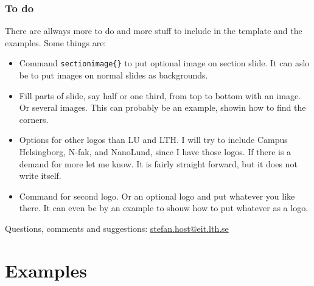 \documentclass[aspectratio=1610]{beamer}
\def\txtbs{\symbol{92}}
\begin{document}
\begin{frame}%
  \frametitle{To do}
  There are allways more to do and more stuff to include in the template and the examples. Some things are: 
  \begin{itemize}
  \item Command \texttt{\txtbs sectionimage\{\}} to put optional image on section slide. It can aslo be to put images on normal slides as backgrounds. 
  \item Fill parts of slide, say half or one third, from top to bottom with an image. Or several images. This can probably be an example, showin how to find the corners. 
  \item Options for other logos than LU and LTH. I will try to include Campus Helsingborg, N-fak, and NanoLund, since I have those logos. If there is a demand for more let me know. It is fairly straight forward, but it does not write itself.
  \item Command for second logo. Or an optional logo and put whatever you like there. It can even be by an example to shouw how to put whatever as a logo.
  \end{itemize}
  Questions, comments and suggestions: \href{mailto:stefan.host@eit.lth.se}{stefan.host@eit.lth.se}
\end{frame}

\section{Examples}
\end{document}

